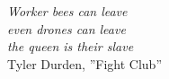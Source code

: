 \begin{titlepage}

\nonumber
\null {}
    \begin{center}
\textit{Worker bees can leave\\
even drones can leave\\
the queen is their slave} \\[5mm]
	Tyler Durden, ''Fight Club''
    \end{center}
\null

\end{titlepage}
\cleardoublepage